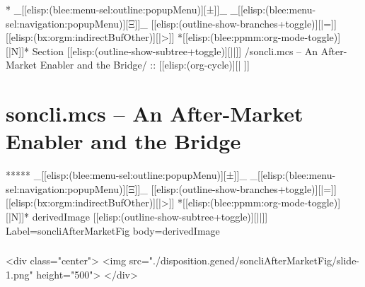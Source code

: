 \begin{whenOrg}
\begin{verblatex}
\begin{frame}[fragile,label=part_soncli.mcs]
    \tableofcontents

\end{frame}
\end{verblatex}


\begin{whenOrg}
*  _[[elisp:(blee:menu-sel:outline:popupMenu)][±]]_ _[[elisp:(blee:menu-sel:navigation:popupMenu)][Ξ]]_ [[elisp:(outline-show-branches+toggle)][|=]] [[elisp:(bx:orgm:indirectBufOther)][|>]] *[[elisp:(blee:ppmm:org-mode-toggle)][|N]]*  Section    [[elisp:(outline-show-subtree+toggle)][||]]   /soncli.mcs -- An After-Market Enabler and the Bridge/ ::  [[elisp:(org-cycle)][| ]]
\end{whenOrg}

\section{soncli.mcs -- An After-Market Enabler and the Bridge}


\begin{whenOrg}
*****  _[[elisp:(blee:menu-sel:outline:popupMenu)][±]]_ _[[elisp:(blee:menu-sel:navigation:popupMenu)][Ξ]]_ [[elisp:(outline-show-branches+toggle)][|=]] [[elisp:(bx:orgm:indirectBufOther)][|>]] *[[elisp:(blee:ppmm:org-mode-toggle)][|N]]*  derivedImage [[elisp:(outline-show-subtree+toggle)][||]] Label=soncliAfterMarketFig  body=derivedImage
\end{whenOrg}

\begin{htmlonly}

\begin{frame}[fragile,plain,label=soncliAfterMarketFig]
    \frametitle{}
    \framesubtitle{}
    \begin{rawhtml}
<div class="center">
<img src="./disposition.gened/soncliAfterMarketFig/slide-1.png" height="500">
</div>
    \end{rawhtml}
\end{frame}
\end{htmlonly}


\end{whenOrg}
